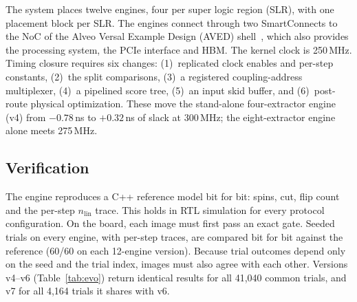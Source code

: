 The system places twelve engines, four per super logic region (SLR), with one placement block per SLR. The engines connect through two SmartConnects to the NoC of the Alveo Versal Example Design (AVED) shell~\cite{amd_aved}, which also provides the processing system, the PCIe interface and HBM. The kernel clock is 250\,MHz. Timing closure requires six changes: (1)~replicated clock enables and per-step constants, (2)~the split comparisons, (3)~a registered coupling-address multiplexer, (4)~a pipelined score tree, (5)~an input skid buffer, and (6)~post-route physical optimization.
These move the stand-alone four-extractor engine (v4) from $-0.78$\,ns to $+0.32$\,ns of slack at 300\,MHz; the eight-extractor engine alone meets 275\,MHz.

\subsection{Verification}\label{subsec:verif}
The engine reproduces a C++ reference model bit for bit: spins, cut, flip count and the per-step $n_{\mathrm{lin}}$ trace. This holds in RTL simulation for every protocol configuration. On the board, each image must first pass an exact gate. Seeded trials on every engine, with per-step traces, are compared bit for bit against the reference (60/60 on each 12-engine version). Because trial outcomes depend only on the seed and the trial index, images must also agree with each other. Versions v4--v6 (Table~\ref{tab:evo}) return identical results for all 41{,}040 common trials, and v7 for all 4{,}164 trials it shares with v6.

